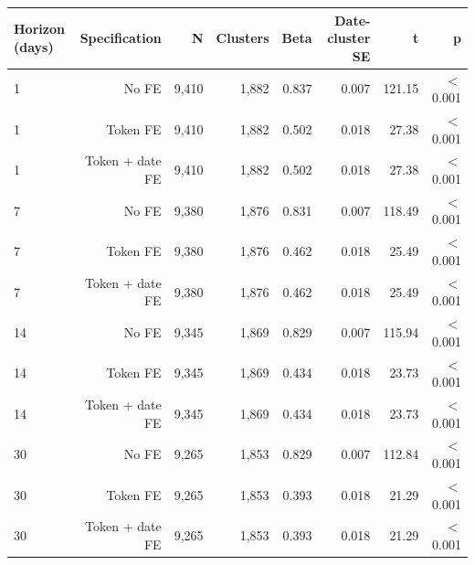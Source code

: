 \begin{tabular}{lrrrrrrr}
\toprule
Horizon (days) & Specification & N & Clusters & Beta & Date-cluster SE & t & p \\
\midrule
1 & No FE & 9,410 & 1,882 & 0.837 & 0.007 & 121.15 & \ensuremath{<}0.001 \\
1 & Token FE & 9,410 & 1,882 & 0.502 & 0.018 & 27.38 & \ensuremath{<}0.001 \\
1 & Token + date FE & 9,410 & 1,882 & 0.502 & 0.018 & 27.38 & \ensuremath{<}0.001 \\
7 & No FE & 9,380 & 1,876 & 0.831 & 0.007 & 118.49 & \ensuremath{<}0.001 \\
7 & Token FE & 9,380 & 1,876 & 0.462 & 0.018 & 25.49 & \ensuremath{<}0.001 \\
7 & Token + date FE & 9,380 & 1,876 & 0.462 & 0.018 & 25.49 & \ensuremath{<}0.001 \\
14 & No FE & 9,345 & 1,869 & 0.829 & 0.007 & 115.94 & \ensuremath{<}0.001 \\
14 & Token FE & 9,345 & 1,869 & 0.434 & 0.018 & 23.73 & \ensuremath{<}0.001 \\
14 & Token + date FE & 9,345 & 1,869 & 0.434 & 0.018 & 23.73 & \ensuremath{<}0.001 \\
30 & No FE & 9,265 & 1,853 & 0.829 & 0.007 & 112.84 & \ensuremath{<}0.001 \\
30 & Token FE & 9,265 & 1,853 & 0.393 & 0.018 & 21.29 & \ensuremath{<}0.001 \\
30 & Token + date FE & 9,265 & 1,853 & 0.393 & 0.018 & 21.29 & \ensuremath{<}0.001 \\
\bottomrule
\end{tabular}
